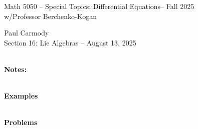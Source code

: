 \documentclass[12pt,a4paper]{report}
\newcommand{\CLASSNAME}{Math 5050 -- Special Topics: Differential Equations}
\newcommand{\STUDENTNAME}{Paul Carmody}
\newcommand{\ASSIGNMENT}{Section 16: Lie Algebras }
\newcommand{\DUEDATE}{August 13, 2025}
\newcommand{\PROFESSOR}{Professor Berchenko-Kogan}
\newcommand{\SEMESTER}{Fall 2025}
\begin{document}
\begin{center}
	\Large{\CLASSNAME -- \SEMESTER} \\
	\large{ w/\PROFESSOR}
\end{center}
\begin{center}
	\STUDENTNAME \\
	\ASSIGNMENT -- \DUEDATE\\
\end{center} 

\noindent \textbf{\\\large{Notes:}}

\noindent \textbf{\\\large{Examples}}


\noindent \textbf{\\\large{Problems}}
\end{document}

